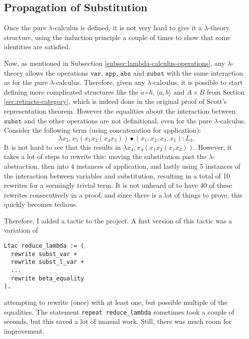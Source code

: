 \subsection{Propagation of Substitution}
Once the pure $ \lambda $-calculus is defined, it is not very hard to give it a $ \lambda $-theory structure, using the induction principle a couple of times to show that some identities are satisfied.

Now, as mentioned in Subsection \ref{subsec:lambda-calculus-operations}, any $ \lambda $-theory allows the operations $ \mathtt{var} $, $ \mathtt{app} $, $ \mathtt{abs} $ and $ \mathtt{subst} $ with the same interaction as for the pure $ \lambda $-calculus. Therefore, given any $ \lambda $-calculus, it is possible to start defining more complicated structures like the $ a \circ b $, $ \langle a, b \rangle $ and $ A \times B $ from Section \ref{sec:retracts-category}, which is indeed done in the original proof of Scott's representation theorem. However the equalities about the interaction between $ \mathtt{subst} $ and the other operations are not definitional, even for the pure $ \lambda $-calculus. Consider the following term (using concatenation for application):
\[ \lambda x_5, x_5 (x_1 x_2 (x_4 x_3)) \bullet (x_1, x_2, x_3, x_1) : L_3. \]
It is not hard to see that this results in $ \lambda x_4, x_4 (x_1 x_2 (x_1 x_3)) $. However, it takes a lot of steps to rewrite this: moving the substitution past the $ \lambda $-abstraction, then into 4 instances of application, and lastly using 5 instances of the interaction between variables and substitution, resulting in a total of 10 rewrites for a seemingly trivial term. It is not unheard of to have 40 of these rewrites consecutively in a proof, and since there is a lot of things to prove, this quickly becomes tedious.

Therefore, I added a tactic to the project. A first version of this tactic was a variation of
\begin{lstlisting}
Ltac reduce_lambda := (
  rewrite subst_var +
  rewrite subst_l_var +
  ...
  rewrite beta_equality
).
\end{lstlisting}
attempting to rewrite (once) with at least one, but possible multiple of the equalities. The statement \texttt{repeat reduce\_lambda} sometimes took a couple of seconds, but this saved a lot of manual work. Still, there was much room for improvement.

